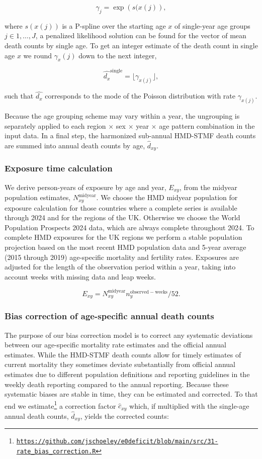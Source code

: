 \documentclass[12pt]{article}
\begin{document}
$$
\gamma_j = \exp\left(s(x(j)\right),
$$

where $s(x(j))$ is a P-spline over the starting age $x$ of single-year age groups $j \in 1,\ldots,J$, a penalized likelihood solution can be found for the vector of mean death counts by single age. To get an integer estimate of the death count in single age $x$ we round $\gamma_x(j)$ down to the next integer,

$$
\hat{d_x}^\mathrm{single} = \lfloor\gamma_{x(j)}\rfloor,
$$

such that $\hat{d_x}$ corresponds to the mode of the Poisson distribution with rate $\gamma_{x(j)}$.

Because the age grouping scheme may vary within a year, the ungrouping is separately applied to each region $\times$ sex $\times$ year $\times$ age pattern combination in the input data. In a final step, the harmonized sub-annual HMD-STMF death counts are summed into annual death counts by age, $\hat{d}_{xy}$.

\subsubsection{Exposure time calculation}

We derive person-years of exposure by age and year, $E_{xy}$, from the midyear population estimates, $N_{xy}^\mathrm{midyear}$. We choose the HMD midyear population for exposure calculation for those countries where a complete series is available through 2024 and for the regions of the UK. Otherwise we choose the World Population Prospects 2024 data, which are always complete throughout 2024. To complete HMD exposures for the UK regions we perform a stable population projection based on the most recent HMD population data and 5-year average (2015 through 2019) age-specific mortality and fertility rates. Exposures are adjusted for the length of the observation period within a year, taking into account weeks with missing data and leap weeks.

$$
E_{xy} = N_{xy}^\mathrm{midyear}n_y^\mathrm{observed-weeks}/52.
$$

\subsubsection{Bias correction of age-specific annual death counts}

The purpose of our bias correction model is to correct any systematic deviations between our age-specific mortality rate estimates and the official annual estimates. While the HMD-STMF death counts allow for timely estimates of current mortality they sometimes deviate substantially from official annual estimates due to different population definitions and reporting guidelines in the weekly death reporting compared to the annual reporting. Because these systematic biases are stable in time, they can be estimated and corrected. To that end we estimate\footnote{\href{https://github.com/jschoeley/e0deficit/blob/main/src/31-rate_bias_correction.R}{\texttt{https://github.com/jschoeley/e0deficit/blob/main/src/31-rate\_bias\_correction.R}}} a correction factor $\widehat{c}_{xy}$ which, if multiplied with the single-age annual death counts, $\widehat{d}_{xy}$, yields the corrected counts:
\end{document}
